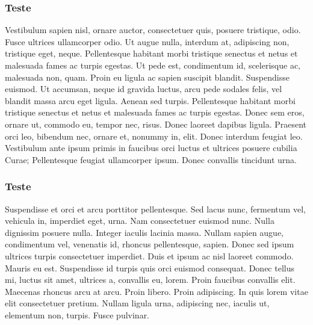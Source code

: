 \subsubsection{Teste}
Vestibulum sapien nisl, ornare auctor, consectetuer quis, posuere tristique, odio. Fusce ultrices ullamcorper odio. Ut augue nulla, interdum at, adipiscing non, tristique eget, neque. Pellentesque habitant morbi tristique senectus et netus et malesuada fames ac turpis egestas. Ut pede est, condimentum id, scelerisque ac, malesuada non, quam. Proin eu ligula ac sapien suscipit blandit. Suspendisse euismod. Ut accumsan, neque id gravida luctus, arcu pede sodales felis, vel blandit massa arcu eget ligula. Aenean sed turpis. Pellentesque habitant morbi tristique senectus et netus et malesuada fames ac turpis egestas. Donec sem eros, ornare ut, commodo eu, tempor nec, risus. Donec laoreet dapibus ligula. Praesent orci leo, bibendum nec, ornare et, nonummy in, elit. Donec interdum feugiat leo. Vestibulum ante ipsum primis in faucibus orci luctus et ultrices posuere cubilia Curae; Pellentesque feugiat ullamcorper ipsum. Donec convallis tincidunt urna.
\subsubsection{Teste}
Suspendisse et orci et arcu porttitor pellentesque. Sed lacus nunc, fermentum vel, vehicula in, imperdiet eget, urna. Nam consectetuer euismod nunc. Nulla dignissim posuere nulla. Integer iaculis lacinia massa. Nullam sapien augue, condimentum vel, venenatis id, rhoncus pellentesque, sapien. Donec sed ipsum ultrices turpis consectetuer imperdiet. Duis et ipsum ac nisl laoreet commodo. Mauris eu est. Suspendisse id turpis quis orci euismod consequat. Donec tellus mi, luctus sit amet, ultrices a, convallis eu, lorem. Proin faucibus convallis elit. Maecenas rhoncus arcu at arcu. Proin libero. Proin adipiscing. In quis lorem vitae elit consectetuer pretium. Nullam ligula urna, adipiscing nec, iaculis ut, elementum non, turpis. Fusce pulvinar.